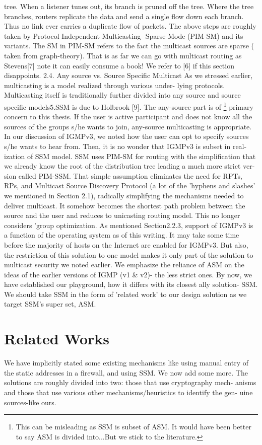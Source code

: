 \documentclass[11pt,left=2cm,bottom=2cm,oneside]{book}
\begin{document}
tree. When a listener tunes out, its branch is pruned off the tree. Where the
tree
branches, routers replicate the data and send a single flow down each branch.
Thus
no link ever carries a duplicate flow of packets.
The above steps are roughly taken by Protocol Independent Multicasting-
Sparse Mode (PIM-SM) and its variants. The SM in PIM-SM refers to the fact the
multicast sources are sparse ( taken from graph-theory). That is as far we can
go
with multicast routing as Stevens[7] note it can easily consume a book! We
refer
to [6] if this section disappoints.
2.4. Any source vs. Source Specific Multicast
As we stressed earlier, multicasting is a model realized through various
under-
lying protocols. Multicasting itself is traditionally further divided into any
source
and source specific models5.SSM is due to Holbrook [9]. The any-source part is
of
\footnote{This can be misleading as SSM is subset of ASM. It would have been better to
say ASM is
divided into...But we stick to the literature.}
primary concern to this thesis.
If the user is active participant and does not know all the sources of the
groups
s/he wants to join, any-source multicasting is appropriate.
In our discussion of IGMPv3, we noted how the user can opt to specify sources
s/he wants to hear from. Then, it is no wonder that IGMPv3 is subset in real-
ization of SSM model. SSM uses PIM-SM for routing with the simplification that
we already know the root of the distribution tree leading a much more strict
ver-
sion called PIM-SSM. That simple assumption eliminates the need for RPTs, RPs,
and Multicast Source Discovery Protocol (a lot of the 'hyphens and slashes' we
mentioned in Section 2.1), radically simplifying the mechanisms needed to
deliver
multicast. It somehow becomes the shortest path problem between the source and
the user and reduces to unicasting routing model. This no longer considers
'group
optimization. As mentioned Section2.2.3, support of IGMPv3 is a function of
the
operating system as of this writing. It may take some time before the majority
of hosts on the Internet are enabled for IGMPv3. But also, the restriction of
this
solution to one model makes it only part of the solution to multicast security
we
noted earlier. We emphasize the reliance of ASM on the ideas of the earlier
versions
of IGMP (v1 \& v2)- the less strict ones.
By now, we have established our playground, how it differs with its closest
ally
solution- SSM. We should take SSM in the form of 'related work' to our design
solution as we target SSM's super set, ASM.
\section{Related Works}
We have implicitly stated some existing mechanisms like using manual entry of
the static addresses in a firewall, and using SSM. We now add some more.
The solutions are roughly divided into two: those that use cryptography mech-
anisms and those that use various other mechanisms/heuristics to identify the
gen-
uine sources-like ours.
\end{document}
